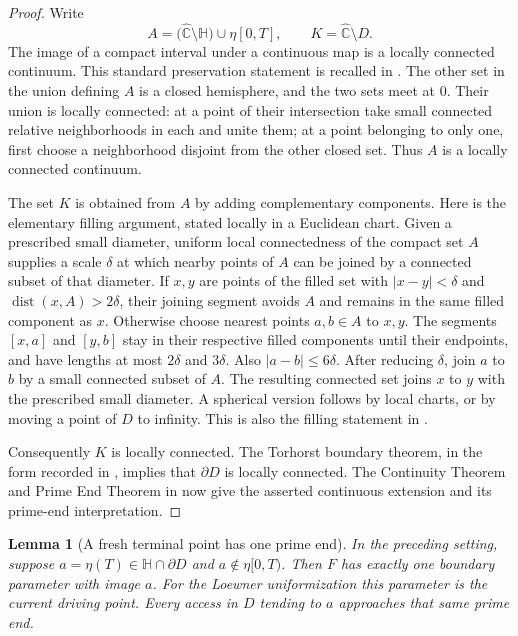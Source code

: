 \documentclass[11pt]{article}
\newtheorem{lemma}[theorem]{Lemma}
\theoremstyle{definition}
\theoremstyle{remark}
\numberwithin{equation}{section}
\begin{document}
\begin{proof}
Write
\[
 A=\bigl(\widehat{\mathbb C}\setminus\mathbb H\bigr)
       \cup\eta[0,T],
 \qquad K=\widehat{\mathbb C}\setminus D.
\]
The image of a compact interval under a continuous map is a locally
connected continuum.  This standard preservation statement is recalled in
\cite[Chapter~2, \S2.2, p.~19]{pommerenke1992}.
The other set in the union defining $A$ is a closed hemisphere, and the
two sets meet at $0$.  Their union is locally connected: at a point of
their intersection take small connected relative neighborhoods in each
and unite them; at a point belonging to only one, first choose a
neighborhood disjoint from the other closed set.  Thus $A$ is a locally
connected continuum.

The set $K$ is obtained from $A$ by adding complementary components.
Here is the elementary filling argument, stated locally in a Euclidean
chart.  Given a prescribed small diameter, uniform local connectedness of
the compact set $A$ supplies a scale $\delta$ at which nearby points of
$A$ can be joined by a connected subset of that diameter.  If $x,y$ are
points of the filled set with $|x-y|<\delta$ and
$\operatorname{dist}(x,A)>2\delta$, their joining segment avoids $A$
and remains in the same filled component as $x$.  Otherwise choose
nearest points $a,b\in A$ to $x,y$.  The segments $[x,a]$ and $[y,b]$
stay in their respective filled components until their endpoints, and
have lengths at most $2\delta$ and $3\delta$.  Also
$|a-b|\le6\delta$.  After reducing $\delta$, join $a$ to $b$ by a
small connected subset of $A$.  The resulting connected set joins
$x$ to $y$ with the prescribed small diameter.  A spherical version
follows by local charts, or by moving a point of $D$ to infinity.
This is also the filling statement in
\cite[\S2, Lemma~2.4, p.~7]{loridantluo2017}.

Consequently $K$ is locally connected.  The Torhorst boundary theorem,
in the form recorded in
\cite[\S2, Lemma~2.6, p.~8]{loridantluo2017}, implies that
$\partial D$ is locally connected.  The Continuity Theorem and Prime
End Theorem in \cite[Chapter~2, \S2.1, p.~18]{pommerenke1992} now give
the asserted continuous extension and its prime-end interpretation.
\end{proof}

\begin{lemma}[A fresh terminal point has one prime end]
\label{geom:fresh-tip}
In the preceding setting, suppose
$a=\eta(T)\in\mathbb H\cap\partial D$ and
$a\notin\eta[0,T)$.  Then $F$ has exactly one boundary parameter with
image $a$.  For the Loewner uniformization this parameter is the current
driving point.  Every access in $D$ tending to $a$ approaches that same
prime end.
\end{lemma}
\end{document}
